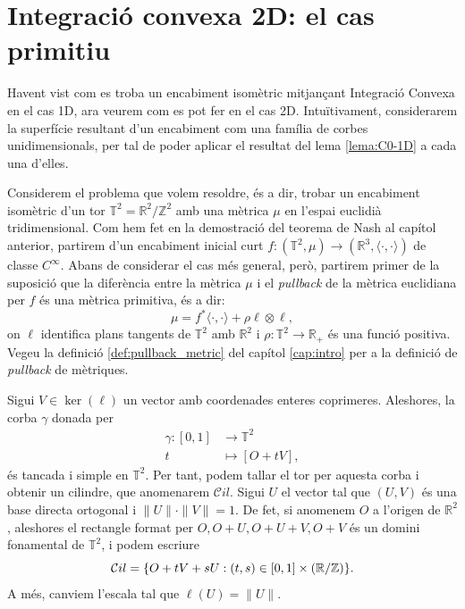 \section{Integració convexa 2D: el cas primitiu}
Havent vist com es troba un encabiment isomètric mitjançant Integració Convexa en el cas 1D, ara veurem com es pot fer en el cas 2D. Intuïtivament, considerarem la superfície resultant d'un encabiment com una família de corbes unidimensionals, per tal de poder aplicar el resultat del lema \ref{lema:C0-1D} a cada una d'elles.

Considerem el problema que volem resoldre, és a dir, trobar un encabiment isomètric d'un tor $\mathbb T^2 = \mathbb R^2/\mathbb Z^2$ amb una mètrica $\mu$ en l'espai euclidià tridimensional. Com hem fet en la demostració del teorema de Nash al capítol anterior, partirem d'un encabiment inicial curt $f:(\mathbb T^2, \mu)\to(\mathbb R^3, \langle\cdot, \cdot\rangle)$ de classe $C^\infty$. Abans de considerar el cas més general, però, partirem primer de la suposició que la diferència entre la mètrica $\mu$ i el \textit{pullback} de la mètrica euclidiana per $f$ és una mètrica primitiva, és a dir:
\begin{equation}\label{eq:def primitiva}
    \mu = f^*\langle\cdot, \cdot\rangle + \rho \ell\otimes \ell,
\end{equation}
on $\ell$ identifica plans tangents de $\mathbb T^2$ amb $\mathbb R^2$ i $\rho:\mathbb T^2\to\mathbb R_+$ és una funció positiva. Vegeu la definició \ref{def:pullback_metric} del capítol \ref{cap:intro} per a la definició de \textit{pullback} de mètriques.

Sigui $V\in\ker(\ell)$ un vector amb coordenades enteres coprimeres. Aleshores, la corba $\gamma$ donada per 
\begin{align}
    \nonumber\gamma:[0,1]&\to\mathbb T^2\\
    \nonumber t&\mapsto [O+tV],
\end{align}
és tancada i simple en $\mathbb T^2$. Per tant, podem tallar el tor per aquesta corba i obtenir un cilindre, que anomenarem $\mathcal Cil$. Sigui $U$ el vector tal que $(U,V)$ és una base directa ortogonal i $\|U\|\cdot\|V\|=1$. De fet, si anomenem $O$ a l'origen de $\mathbb R^2$, aleshores el rectangle format per $O, O+U, O+U+V, O+V$ és un domini fonamental de $\mathbb T^2$, i podem escriure 
\begin{equation*}
    \mathcal Cil = \{O+tV+sU : (t,s)\in[0,1]\times(\mathbb R / \mathbb Z)\}.
\end{equation*}
A més, canviem l'escala tal que $\ell(U)=\|U\|$.

